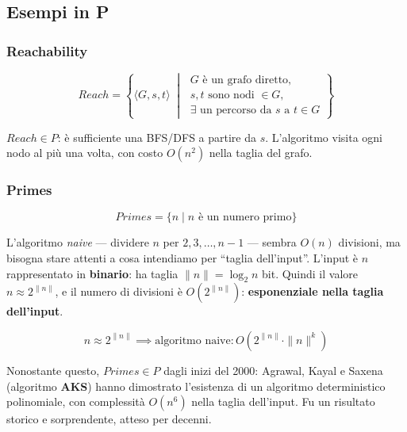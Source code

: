 \subsection{Esempi in P}

\subsubsection{Reachability}

\[
  Reach = \left\{ \langle G, s, t \rangle \;\middle|\;
  \begin{array}{l}
    G \text{ è un grafo diretto,} \\
    s, t \text{ sono nodi } \in G, \\
    \exists \text{ un percorso da } s \text{ a } t \in G
  \end{array}
  \right\}
\]

$Reach \in P$: è sufficiente una BFS/DFS a partire da $s$. L'algoritmo visita ogni nodo al più una volta, con costo $O(n^2)$ nella taglia del grafo.

\subsubsection{Primes}

\[
  Primes = \{ n \mid n \text{ è un numero primo} \}
\]

L'algoritmo \textit{naive} — dividere $n$ per $2, 3, \ldots, n-1$ — sembra $O(n)$ divisioni, ma bisogna stare attenti a cosa intendiamo per ``taglia dell'input''. L'input è $n$ rappresentato in \textbf{binario}: ha taglia $\|n\| = \log_2 n$ bit. Quindi il valore $n \approx 2^{\|n\|}$, e il numero di divisioni è $O(2^{\|n\|})$: \textbf{esponenziale nella taglia dell'input}.

\[
  n \approx 2^{\|n\|} \implies \text{algoritmo naive}: O\!\left(2^{\|n\|} \cdot \|n\|^k\right)
\]

Nonostante questo, $Primes \in P$ dagli inizi del 2000: Agrawal, Kayal e Saxena (algoritmo \textbf{AKS}) hanno dimostrato l'esistenza di un algoritmo deterministico polinomiale, con complessità $O(n^6)$ nella taglia dell'input. Fu un risultato storico e sorprendente, atteso per decenni.


